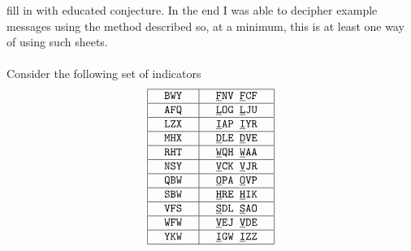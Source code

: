 fill in with educated conjecture. In the end I was able to decipher
example messages using the method described so, at a minimum, this is
at least one way of using such sheets.
\\\\Consider the following set of indicators
\[
	\setlength{\arraycolsep}{15pt}
	\begin{array}{|c | c|}
		\hline
		\texttt{BWY} & \texttt{}{\uline{\texttt{F}}}\texttt{NV
		}{\uline{\texttt{F}}}\texttt{CF}                       \\
		\hline
		\texttt{AFQ} & \texttt{}{\uline{\texttt{L}}}\texttt{OG
		}{\uline{\texttt{L}}}\texttt{JU}                       \\
		\hline
		\texttt{LZX} & \texttt{}{\uline{\texttt{I}}}\texttt{AP
		}{\uline{\texttt{I}}}\texttt{YR}                       \\
		\hline
		\texttt{MHX} & \texttt{}{\uline{\texttt{D}}}\texttt{LE
		}{\uline{\texttt{D}}}\texttt{VE}                       \\
		\hline
		\texttt{RHT} & \texttt{}{\uline{\texttt{W}}}\texttt{QH
		}{\uline{\texttt{W}}}\texttt{AA}                       \\
		\hline
		\texttt{NSY} & \texttt{}{\uline{\texttt{V}}}\texttt{CK
		}{\uline{\texttt{V}}}\texttt{JR}                       \\
		\hline
		\texttt{QBW} & \texttt{}{\uline{\texttt{O}}}\texttt{PA
		}{\uline{\texttt{O}}}\texttt{VP}                       \\
		\hline
		\texttt{SBW} & \texttt{}{\uline{\texttt{H}}}\texttt{RE
		}{\uline{\texttt{H}}}\texttt{IK}                       \\
		\hline
		\texttt{VFS} & \texttt{}{\uline{\texttt{S}}}\texttt{DL
		}{\uline{\texttt{S}}}\texttt{AO}                       \\
		\hline
		\texttt{WFW} & \texttt{}{\uline{\texttt{V}}}\texttt{EJ
		}{\uline{\texttt{V}}}\texttt{DE}                       \\
		\hline
		\texttt{YKW} & \texttt{}{\uline{\texttt{I}}}\texttt{GW
		}{\uline{\texttt{I}}}\texttt{ZZ}                       \\
		\hline
	\end{array}
\]
